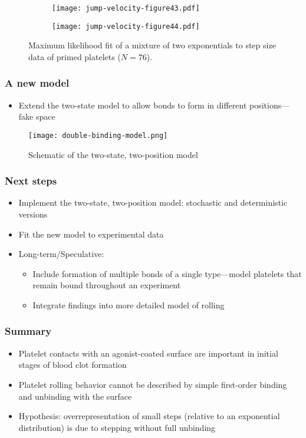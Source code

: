 \documentclass{beamer}
\begin{document}
\begin{frame}
  \begin{figure}
    \centering
    \begin{subfigure}{0.48\textwidth}
      \texttt{[image: jump-velocity-figure43.pdf]}
    \end{subfigure}
    \hfill
    \begin{subfigure}{0.48\textwidth}
      \texttt{[image: jump-velocity-figure44.pdf]}
    \end{subfigure}
    \caption{Maximum likelihood fit of a mixture of two exponentials
      to step size data of primed platelets ($N = 76$). }
    \label{fig:step-fit}
  \end{figure}
\end{frame}

\begin{frame}
  \frametitle{A new model}
  \begin{itemize}
  \item Extend the two-state model to allow bonds to form in different
    positions---fake space
  \end{itemize}

  \begin{figure}
    \centering
    \texttt{[image: double-binding-model.png]}
    \caption{Schematic of the two-state, two-position model}
    \label{fig:two-state-two-position}
  \end{figure}
\end{frame}

\begin{frame}
  \frametitle{Next steps}
  \begin{itemize}
  \item Implement the two-state, two-position model: stochastic and
    deterministic versions
  \item Fit the new model to experimental data
  \item Long-term/Speculative:
    \begin{itemize}
    \item Include formation of multiple bonds of a single
      type---model platelets that remain bound throughout an
      experiment
    \item Integrate findings into more detailed model of rolling
    \end{itemize}
  \end{itemize}
\end{frame}

\begin{frame}
  \frametitle{Summary}
  \begin{itemize}
  \item Platelet contacts with an agonist-coated surface are important
    in initial stages of blood clot formation
  \item Platelet rolling behavior cannot be described by simple
    first-order binding and unbinding with the surface
  \item Hypothesis: overrepresentation of small steps (relative to an
    exponential distribution) is due to stepping without full
    unbinding
  \end{itemize}
\end{frame}
\end{document}
